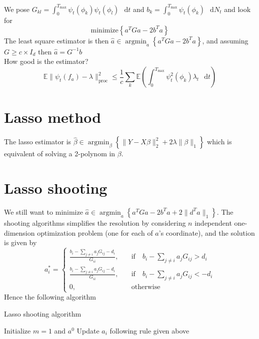 \documentclass{report}
\newcommand{\dd}{\mathop{}\,\mathrm{d}}
\DeclareMathOperator\argmin{argmin}
\begin{document}
				We pose $G_{kl}=\int_0^{T_{\text{max}}}\psi_t(\phi_k)\psi_t(\phi_l)\dd t$ and $b_k=\int_0^{T_\text{max}}\psi_t(\phi_k)\dd N_t$ and look for \[\text{minimize}\left\{a^TGa-2b^Ta\right\}\]
				The least square estimator is then $\widehat{a}\in\argmin_a\left\{a^TGa-2b^Ta\right\}$, and assuming $G\ge c\times I_d$ then $\widehat{a}=G^{-1}b$\\
				How good is the estimator? \[\mathbb{E}\|\psi_t(f_a)-\lambda\|_{\text{proc}}^2\le\frac{1}{c}\sum_k\mathbb{E}\left(\int_0^{T_{\text{max}}}\psi_t^2(\phi_k)\lambda_t\dd t\right)\]

		\section{Lasso method}
			The lasso estimator is $\widehat{\beta}\in\argmin_{\beta}\left\{\|Y-X\beta\|_2^2+2\lambda\|\beta\|_1\right\}$ which is equivalent of solving a 2-polynom in $\beta$.

		\section{Lasso shooting}
			We still want to minimize $\widehat{a}\in\argmin_a\left\{a^TGa-2b^Ta+2\|d^Ta\|_1\right\}$. The shooting algorithms simplifies the resolution by considering $n$ independent one-dimension optimization problem (one for each of $a$'s coordinate), and the solution is given by \[
				a_i^*=\begin{cases}
					\frac{b_i-\sum_{j\neq i}a_jG_{ij}-d_i}{G_{ii}},&\quad\text{if}\quad b_i-\sum_{j\neq i}a_jG_{ij}>d_i\\
					\frac{b_i-\sum_{j\neq i}a_jG_{ij}-d_i}{G_{ii}},&\quad\text{if}\quad b_i-\sum_{j\neq i}a_jG_{ij}<-d_i\\
					0,&\quad\text{otherwise}
				\end{cases}
			\]
			Hence the following algorithm \begin{algorithm}[h]
				\caption{Lasso shooting algorithm}
				\begin{algorithmic}[1]
					\State Initialize $m=1$ and $a^0$
					\Repeat
							\State Update $a_i$ following rule given above
						\EndFor
				\end{algorithmic}
			\end{algorithm}
\end{document}
